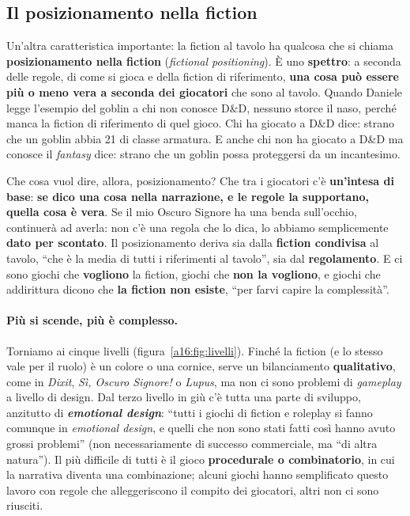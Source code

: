 \subsection{Il posizionamento nella fiction}

Un'altra caratteristica importante: la fiction al tavolo ha qualcosa che si chiama
\textbf{posizionamento nella fiction} (\emph{fictional positioning}). È uno \textbf{spettro}: a
seconda delle regole, di come si gioca e della fiction di riferimento, \textbf{una cosa può essere
più o meno vera a seconda dei giocatori} che sono al tavolo. Quando Daniele legge l'esempio del
goblin a chi non conosce D\&D, nessuno storce il naso, perché manca la fiction di riferimento di
quel gioco. Chi ha giocato a D\&D dice: strano che un goblin abbia 21 di classe armatura. E anche
chi non ha giocato a D\&D ma conosce il \emph{fantasy} dice: strano che un goblin possa
proteggersi da un incantesimo.

Che cosa vuol dire, allora, posizionamento? Che tra i giocatori c'è \textbf{un'intesa di base}:
\textbf{se dico una cosa nella narrazione, e le regole la supportano, quella cosa è vera}. Se il
mio Oscuro Signore ha una benda sull'occhio, continuerà ad averla: non c'è una regola che lo dica,
lo abbiamo semplicemente \textbf{dato per scontato}. Il posizionamento deriva sia dalla
\textbf{fiction condivisa} al tavolo, ``che è la media di tutti i riferimenti al tavolo'', sia dal
\textbf{regolamento}. E ci sono giochi che \textbf{vogliono} la fiction, giochi che \textbf{non la
vogliono}, e giochi che addirittura dicono che \textbf{la fiction non esiste}, ``per farvi capire
la complessità''.

\paragraph{Più si scende, più è complesso.} Torniamo ai cinque livelli
(figura~\ref{a16:fig:livelli}). Finché la fiction (e lo stesso vale per il ruolo) è un colore o
una cornice, serve un bilanciamento \textbf{qualitativo}, come in \emph{Dixit}, \emph{Sì, Oscuro
Signore!} o \emph{Lupus}, ma non ci sono problemi di \emph{gameplay} a livello di design. Dal
terzo livello in giù c'è tutta una parte di sviluppo, anzitutto di \textbf{\emph{emotional
design}}: ``tutti i giochi di fiction e roleplay si fanno comunque in \emph{emotional design}, e
quelli che non sono stati fatti così hanno avuto grossi problemi'' (non necessariamente di
successo commerciale, ma ``di altra natura''). Il più difficile di tutti è il gioco
\textbf{procedurale o combinatorio}, in cui la narrativa diventa una combinazione; alcuni giochi
hanno semplificato questo lavoro con regole che alleggeriscono il compito dei giocatori, altri non
ci sono riusciti.

